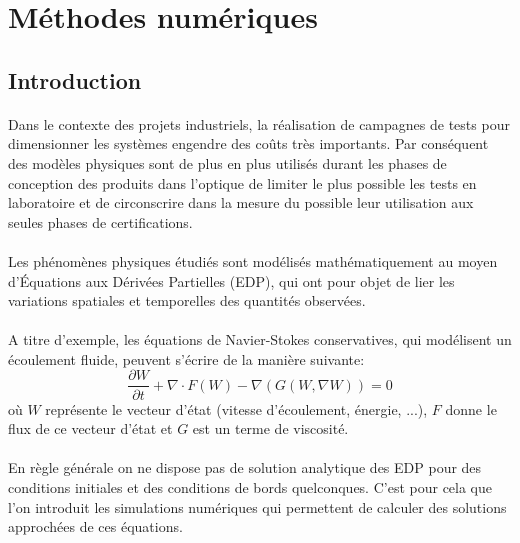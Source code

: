 \section{Méthodes numériques}

\subsection{Introduction}
    \paragraph{}
    Dans le contexte des projets industriels, la réalisation de campagnes de tests pour dimensionner les systèmes engendre des coûts très importants. Par conséquent des modèles physiques sont de plus en plus utilisés durant les phases de conception des produits dans l'optique de limiter le plus possible les tests en laboratoire et de circonscrire dans la mesure du possible leur utilisation aux seules phases de certifications.

    \paragraph{}
    Les phénomènes physiques étudiés sont modélisés mathématiquement au moyen d'Équations aux Dérivées Partielles (EDP), qui ont pour objet de lier les variations spatiales et temporelles des quantités observées.

    \paragraph{}
    A titre d'exemple, les équations de Navier-Stokes conservatives, qui modélisent un écoulement fluide, peuvent s'écrire de la manière suivante:
    \begin{equation}
        \frac{\partial W}{\partial t} + \nabla \cdot F(W) -\nabla\left( G(W,\nabla W)\right)=0
        \label{eq:NS}
    \end{equation}
    où $W$ représente le vecteur d'état (vitesse d'écoulement, énergie, ...), $F$ donne le flux de ce vecteur d'état et $G$ est un terme de viscosité.

    \paragraph{}
    En règle générale on ne dispose pas de solution analytique des EDP pour des conditions initiales et des conditions de bords quelconques. C'est pour cela que l'on introduit les simulations numériques qui permettent de calculer des solutions approchées de ces équations.

